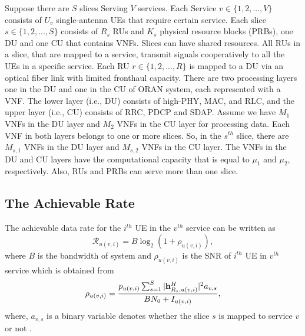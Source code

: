 \documentclass[conference]{IEEEtran}
\begin{document}
\begin{enumerate}
Suppose there are $S$ slices Serving $V$ services. Each Service $v\in \{1,2,...,V \} $ consists of $U_v$
single-antenna UEs that require certain service. Each slice $s \in \{1,2,...,S \}$ consists of $R_s$ RUs and $K_s$ physical resource blocks (PRBs), one DU and one CU that contains VNFs.
Slices can have shared resources. All RUs in a slice, that are mapped to a service, transmit signals cooperatively to all the UEs in a specific service. Each RU $r \in \{1,2,...,R \}$ is mapped to a DU via an optical fiber link with limited fronthaul capacity.
There are two processing layers one in the DU and one in the CU of ORAN system, each represented with a VNF. The lower layer (i.e., DU) consists of high-PHY, MAC, and RLC, and the upper layer (i.e., CU) consists of RRC, PDCP and SDAP. Assume we have $M_1$ VNFs in the DU layer and $M_2$ VNFs in the CU layer for processing data.
Each VNF in both layers belongs to one or more slices. So, in the $s^{th}$ slice, there are $M_{s,1}$ VNFs in the DU layer and $M_{s,2}$ VNFs in the CU layer. The VNFs in the DU and CU layers have the computational capacity that is  equal to $\mu_1$ and $\mu_2$, respectively.
Also, RUs and PRBs can serve more than one slice.
\subsection{The Achievable Rate}
The achievable data rate for the $i^{th}$ UE in the $v^{th}$ service can be written as
\begin{equation}\label{eq1}
\mathcal{R}_{u(v,i)} = B \log_2({1+ \rho_{u(v,i)}}),
\end{equation}
where $B$ is the bandwidth of system and $\rho_{u(v,i)}$ is the SNR of $i^{th}$ UE in $v^{th}$ service which is obtained from
\begin{equation}\label{eq2}
\rho_{u(v,i)} =  \frac{p_{u(v,i)}\sum_{s=1}^{S}|\bold{h}_{R_s,u(v,i)}^H |^2 a_{v,s}}{BN_0 + I_{u(v,i)}},
\end{equation}
where, $a_{v,s}$ is a binary variable denotes whether the slice $s$ is mapped to service $v$ or not .


\end{enumerate}
\end{document}
